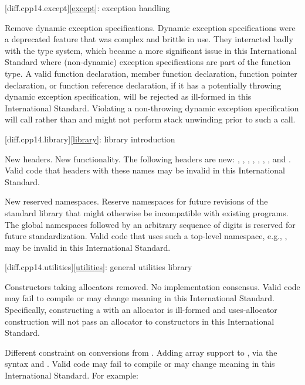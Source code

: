 [diff.cpp14.except]{\ref{except}: exception handling}

\change Remove dynamic exception specifications.
\rationale Dynamic exception specifications were a deprecated feature
that was complex and brittle in use.
They interacted badly with the type system,
which became a more significant issue in this International Standard
where (non-dynamic) exception specifications are part of the function type.
\effect
A valid \CppXIV{} function declaration,
member function declaration,
function pointer declaration,
or function reference declaration,
if it has a potentially throwing dynamic exception specification,
will be rejected as ill-formed in this International Standard.
Violating a non-throwing dynamic exception specification
will call 
rather than 
and might not perform stack unwinding prior to such a call.

[diff.cpp14.library]{\ref{library}: library introduction}

\change New headers.
\rationale New functionality.
\effect
The following \Cpp{} headers are new:
,
,
,
,
,
,
,
and
.
Valid \CppXIV{} code that  headers with these names may be
invalid in this International Standard.

\change New reserved namespaces.
\rationale Reserve namespaces for future revisions of the standard library
that might otherwise be incompatible with existing programs.
\effect
The global namespaces 
followed by an arbitrary sequence of digits
is reserved for future standardization.
Valid \CppXIV{} code that uses such a top-level namespace,
e.g., , may be invalid in this International Standard.

[diff.cpp14.utilities]{\ref{utilities}: general utilities library}

\change Constructors taking allocators removed.
\rationale No implementation consensus.
\effect
Valid \CppXIV{} code may fail to compile or may change meaning in this
International Standard. Specifically, constructing a  with
an allocator is ill-formed and uses-allocator construction will not pass an
allocator to  constructors in this International Standard.

\change Different constraint on conversions from .
\rationale Adding array support to ,
via the syntax  and .
\effect
Valid \CppXIV{} code may fail to compile or may change meaning in this
International Standard.
For example:

